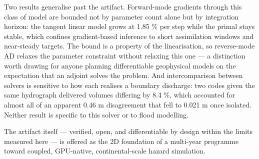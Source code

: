 Two results generalise past the artifact. Forward-mode gradients through
this class of model are bounded not by parameter count alone but by
integration horizon: the tangent linear model grows at 1.85 \% per step
while the primal stays stable, which confines gradient-based inference
to short assimilation windows and near-steady targets. The bound is a
property of the linearisation, so reverse-mode AD relaxes the parameter
constraint without relaxing this one --- a distinction worth drawing for
anyone planning differentiable geophysical models on the expectation
that an adjoint solves the problem. And intercomparison between solvers
is sensitive to how each realises a boundary discharge: two codes given
the same hydrograph delivered volumes differing by 8.4 \%, which
accounted for almost all of an apparent 0.46 m disagreement that fell to
0.021 m once isolated. Neither result is specific to this solver or to
flood modelling.

The artifact itself --- verified, open, and differentiable by design
within the limits measured here --- is offered as the 2D foundation of a
multi-year programme toward coupled, GPU-native, continental-scale
hazard simulation.

